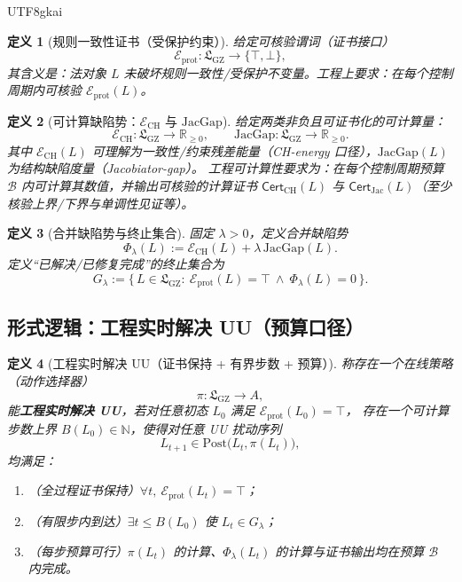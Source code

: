 \documentclass[12pt]{article}
\newtheorem{definition}{定义}[section]
\newcommand{\RR}{\mathbb{R}}
\newcommand{\NN}{\mathbb{N}}
\newcommand{\GZLS}{\ensuremath{\mathfrak{L}_{\mathrm{GZ}}}}
\newcommand{\JacGap}{\ensuremath{\mathrm{JacGap}}} %
\begin{document}
\begin{CJK*}{UTF8}{gkai}
\begin{definition}[规则一致性证书（受保护约束）]
\label{def:uu-eng-prot}
给定可核验谓词（证书接口）
\[
  \mathcal{E}_{\mathrm{prot}}:\GZLS\to\{\top,\bot\},
\]
其含义是：法对象 $L$ 未破坏规则一致性/受保护不变量。工程上要求：在每个控制周期内可核验 $\mathcal{E}_{\mathrm{prot}}(L)$。
\end{definition}

\begin{definition}[可计算缺陷势：$\mathcal{E}_{\mathrm{CH}}$ 与 $\JacGap$]
\label{def:uu-eng-defects}
给定两类非负且可证书化的可计算量：
\[
  \mathcal{E}_{\mathrm{CH}}:\GZLS\to\RR_{\ge 0},\qquad
  \JacGap:\GZLS\to\RR_{\ge 0}.
\]
其中 $\mathcal{E}_{\mathrm{CH}}(L)$ 可理解为一致性/约束残差能量（CH-energy 口径），$\JacGap(L)$ 为结构缺陷度量（Jacobiator-gap）。
工程可计算性要求为：在每个控制周期预算 $\mathcal{B}$ 内可计算其数值，并输出可核验的计算证书
$\mathsf{Cert}_{\mathrm{CH}}(L)$ 与 $\mathsf{Cert}_{\mathrm{Jac}}(L)$（至少核验上界/下界与单调性见证等）。
\end{definition}

\begin{definition}[合并缺陷势与终止集合]
\label{def:uu-eng-phi-goal}
固定 $\lambda>0$，定义合并缺陷势
\[
  \Phi_\lambda(L):=\mathcal{E}_{\mathrm{CH}}(L)+\lambda\,\JacGap(L).
\]
定义“已解决/已修复完成”的终止集合为
\[
  G_\lambda:=\{\,L\in\GZLS:\ \mathcal{E}_{\mathrm{prot}}(L)=\top\ \wedge\ \Phi_\lambda(L)=0\,\}.
\]
\end{definition}

\subsection{形式逻辑：工程实时解决 UU（预算口径）}
\label{sec:uu-eng-realtime}

\begin{definition}[工程实时解决 UU（证书保持 + 有界步数 + 预算）]
\label{def:uu-eng-realtime-solve}
称存在一个在线策略（动作选择器）
\[
  \pi:\GZLS\to A,
\]
能\textbf{工程实时解决 UU}，若对任意初态 $L_0$ 满足 $\mathcal{E}_{\mathrm{prot}}(L_0)=\top$，
存在一个可计算步数上界 $B(L_0)\in\NN$，使得对任意 UU 扰动序列
\[
  L_{t+1}\in \mathrm{Post}\bigl(L_t,\pi(L_t)\bigr),
\]
均满足：
\begin{enumerate}
  \item （全过程证书保持）$\forall t,\ \mathcal{E}_{\mathrm{prot}}(L_t)=\top$；
  \item （有限步内到达）$\exists t\le B(L_0)$ 使 $L_t\in G_\lambda$；
  \item （每步预算可行）$\pi(L_t)$ 的计算、$\Phi_\lambda(L_t)$ 的计算与证书输出均在预算 $\mathcal{B}$ 内完成。
\end{enumerate}
\end{definition}


\end{CJK*}
\end{document}
